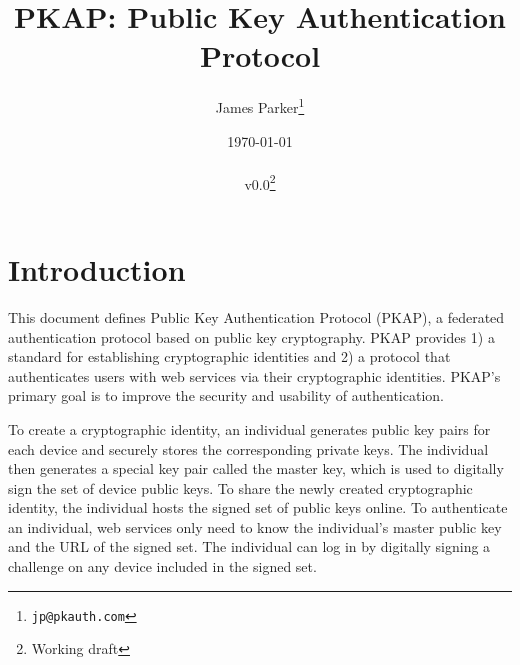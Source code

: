 \documentclass{article}
\newcommand{\pkap}{PKAP}
\newcommand{\pkaplong}{Public Key Authentication Protocol}
\begin{document}
\title{\pkap: \pkaplong}

\author{James Parker\thanks{\texttt{jp@pkauth.com}}}
\date{\today\\ \ \\ v0.0\footnote{Working draft}}


\maketitle

\section{Introduction}

%
%
%



This document defines \pkaplong{} (\pkap{}), a federated authentication protocol based on public key cryptography. 
\pkap{} provides 1) a standard for establishing cryptographic identities and 2) a protocol that authenticates users with web services via their cryptographic identities. 
\pkap{}'s primary goal is to improve the security and usability of authentication. 


%
%
%
%
%


To create a cryptographic identity, an individual generates public key pairs for each device and securely stores the corresponding private keys. 
The individual then generates a special key pair called the master key, which is used to digitally sign the set of device public keys. 
To share the newly created cryptographic identity, the individual hosts the signed set of public keys online. 
To authenticate an individual, web services only need to know the individual's master public key and the URL of the signed set. 
The individual can log in by digitally signing a challenge on any device included in the signed set. 
\end{document}
